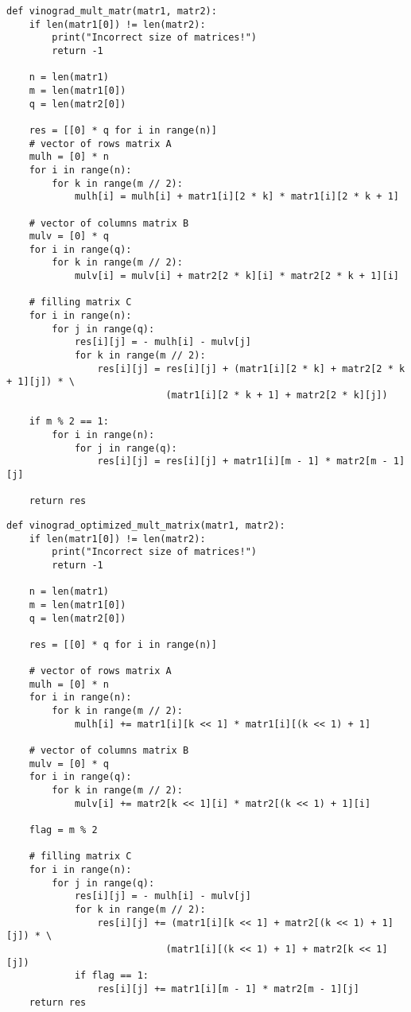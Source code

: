 \begin{lstlisting}[caption=Реализация алгоритма Винограда умножения матриц,
    label={vinograd_mult}]
def vinograd_mult_matr(matr1, matr2):
    if len(matr1[0]) != len(matr2):
        print("Incorrect size of matrices!")
        return -1

    n = len(matr1)
    m = len(matr1[0])
    q = len(matr2[0])

    res = [[0] * q for i in range(n)]
    # vector of rows matrix A
    mulh = [0] * n
    for i in range(n):
        for k in range(m // 2):
            mulh[i] = mulh[i] + matr1[i][2 * k] * matr1[i][2 * k + 1]

    # vector of columns matrix B
    mulv = [0] * q
    for i in range(q):
        for k in range(m // 2):
            mulv[i] = mulv[i] + matr2[2 * k][i] * matr2[2 * k + 1][i]

    # filling matrix C
    for i in range(n):
        for j in range(q):
            res[i][j] = - mulh[i] - mulv[j]
            for k in range(m // 2):
                res[i][j] = res[i][j] + (matr1[i][2 * k] + matr2[2 * k + 1][j]) * \
                            (matr1[i][2 * k + 1] + matr2[2 * k][j])

    if m % 2 == 1:
        for i in range(n):
            for j in range(q):
                res[i][j] = res[i][j] + matr1[i][m - 1] * matr2[m - 1][j]

    return res
\end{lstlisting}

\begin{lstlisting}[caption=Реализация оптимизированного алгоритма Винограда умножения матриц,
	label={vinograd_opt_mult}]
def vinograd_optimized_mult_matrix(matr1, matr2):
    if len(matr1[0]) != len(matr2):
        print("Incorrect size of matrices!")
        return -1

    n = len(matr1)
    m = len(matr1[0])
    q = len(matr2[0])

    res = [[0] * q for i in range(n)]

    # vector of rows matrix A
    mulh = [0] * n
    for i in range(n):
        for k in range(m // 2):
            mulh[i] += matr1[i][k << 1] * matr1[i][(k << 1) + 1]

    # vector of columns matrix B
    mulv = [0] * q
    for i in range(q):
        for k in range(m // 2):
            mulv[i] += matr2[k << 1][i] * matr2[(k << 1) + 1][i]

    flag = m % 2
    
    # filling matrix C
    for i in range(n):
        for j in range(q):
            res[i][j] = - mulh[i] - mulv[j]
            for k in range(m // 2):
                res[i][j] += (matr1[i][k << 1] + matr2[(k << 1) + 1][j]) * \
                            (matr1[i][(k << 1) + 1] + matr2[k << 1][j])
            if flag == 1:
                res[i][j] += matr1[i][m - 1] * matr2[m - 1][j]
    return res

\end{lstlisting}


